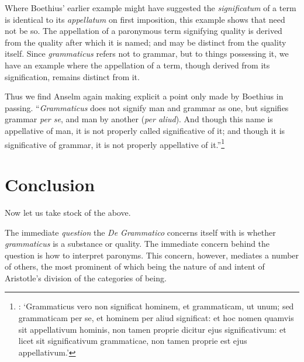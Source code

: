 \documentclass[]{article}
\begin{document}
Where Boethius' earlier example might have suggested the \textit{significatum} of a term is identical to its \textit{appellatum} on first imposition, this example shows that need not be so. The appellation of a paronymous term signifying quality is derived from the quality after which it is named; and may be distinct from the quality itself. Since \textit{grammaticus} refers not to grammar, but to things possessing it, we have an example where the appellation of a term, though derived from its signification, remains distinct from it.

Thus we find Anselm again making explicit a point only made by Boethius in passing. ``\textit{Grammaticus} does not signify man and grammar as one, but signifies grammar \textit{per se}, and man by another (\textit{per aliud}). And though this name is appellative of man, it is not properly called significative of it; and though it is significative of grammar, it is not properly appellative of it.''\footnote{\cite[DG ch. 12]{Anselm1974}: `Grammaticus vero non significat hominem, et grammaticam, ut unum; sed grammaticam per se, et hominem per aliud significat: et hoc nomen quamvis sit appellativum hominis, non tamen proprie dicitur ejus significativum: et licet sit significativum grammaticae, non tamen proprie est ejus appellativum.'}
\section{Conclusion}
Now let us take stock of the above. 

The immediate \textit{question} the \textit{De Grammatico} concerns itself with is whether \textit{grammaticus} is a substance or quality. The immediate concern behind the question is how to interpret paronyms. This concern, however, mediates a number of others, the most prominent of which being the nature of and intent of Aristotle's division of the categories of being.
\end{document}
